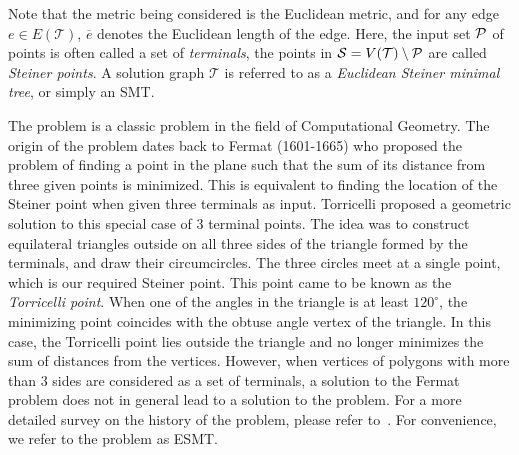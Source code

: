 Note that the metric being considered is the Euclidean metric, and for any edge $e \in E(\mathcal T)$, $\overline e$ denotes the Euclidean length of the edge. Here, the input set $\mathcal{P}$ of points is often called a set of {\it terminals}, the points in $\mathcal{S} = V(\mathcal T) \setminus \mathcal{P}$ are called {\it Steiner points}. A solution graph $\mathcal T$ is referred to as a {\it Euclidean Steiner minimal tree}, or simply an SMT.

 The \ESMT problem is a classic problem in the field of Computational Geometry. The origin of the problem dates back to Fermat (1601-1665) who proposed the problem of finding a point in the plane such that the sum of its distance from three given points is minimized. This is equivalent to finding the location of the Steiner point when given three terminals as input. Torricelli proposed a geometric solution to this special case of 3 terminal points. The idea was to construct equilateral triangles outside on all three sides of the triangle formed by the terminals, and draw their circumcircles. The three circles meet at a single point, which is our required Steiner point. This point came to be known as the {\it Torricelli point}. When one of the angles in the triangle is at least $120^\circ$, the minimizing point coincides with the obtuse angle vertex of the triangle. In this case, the Torricelli point lies outside the triangle and no longer minimizes the sum of distances from the vertices. However, when vertices of polygons with more than 3 sides are considered as a set of terminals, a solution to the Fermat problem does not in general lead to a solution to the \ESMT problem. For a more detailed survey on the history of the problem, please refer to~\cite{brazil2014history,hwang1992steiner}. For convenience, we refer to the \ESMT problem as ESMT.
 


